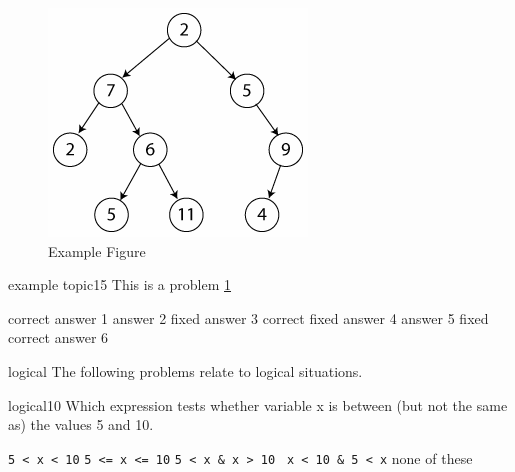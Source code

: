 \documentclass{exam}
\begin{document}

\begin{block}{example topic}
  This is an example of a \textit{block   %
\end{block}

\begin{figure}[placement h]
  \begin{center}
      \includegraphics[scale=0.50]{binary_tree.png}
      \caption{Example Figure}
      \label{fig:example topic}
   \end{center}
\end{figure}

\begin{problem}[require=example topic]{example topic}{15}
  This is a problem
  \ref{fig:example topic}
  \begin{answers}
    \answer[correct] correct answer 1
    \answer answer 2
    \answer[fixed] fixed answer 3
     correct fixed answer 4
    \answer answer 5
     fixed correct answer 6
  \end{answers}
\end{problem}

\begin{block}{logical}
The following problems relate to logical situations.
\end{block}

\begin{problem}[requires=logical]{logical}{10} 
  Which expression tests whether
  variable x is between (but not the same as) the values 5 and 10.
  \begin{answers}
    \answer \verb+5 < x < 10+
    \answer \verb+5 <= x <= 10+
    \answer \verb+5 < x & x > 10 +
    \answer[correct] \verb+x < 10 & 5 < x+ %
    \answer[fixed] none of these  %
  \end{answers}
\end{problem}
\end{document}
